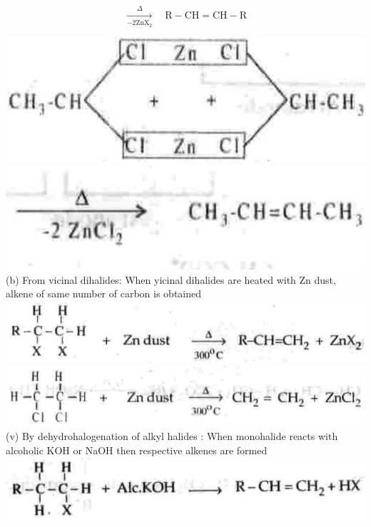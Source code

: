 \documentclass[10pt]{article}
\begin{document}
$$
\xrightarrow[-2 \mathrm{ZnX}_{2}]{\Delta} \quad \mathrm{R}-\mathrm{CH}=\mathrm{CH}-\mathrm{R}
$$

\includegraphics[max width=\textwidth, center]{2025_01_28_8470952b98110cec3aabg-177(1)}\\
\includegraphics[max width=\textwidth, center]{2025_01_28_8470952b98110cec3aabg-177(5)}\\
(b) From vicinal dihalides: When yicinal dihalides are heated with Zn dust, alkene of same number of carbon is obtained\\
\includegraphics[max width=\textwidth, center]{2025_01_28_8470952b98110cec3aabg-177(4)}\\
\includegraphics[max width=\textwidth, center]{2025_01_28_8470952b98110cec3aabg-177}\\
(v) By dehydrohalogenation of alkyl halides : When monohalide reacts with alcoholic KOH or NaOH then respective alkenes are formed\\
\includegraphics[max width=\textwidth, center]{2025_01_28_8470952b98110cec3aabg-178(4)}
\end{document}

